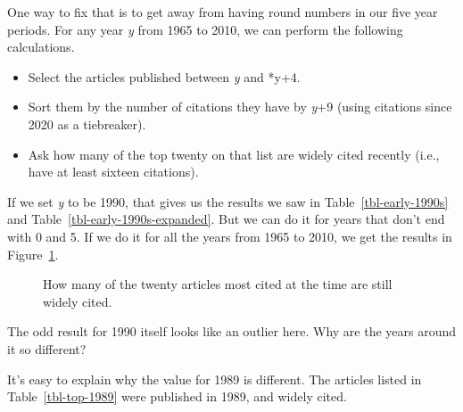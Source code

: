 \documentclass[
  10pt,
  letterpaper,
  DIV=11,
  numbers=noendperiod,
  twoside]{scrartcl}
\providecommand{\tightlist}{%
  \setlength{\itemsep}{0pt}\setlength{\parskip}{0pt}}\usepackage{longtable,booktabs,array}
\begin{document}
One way to fix that is to get away from having round numbers in our five
year periods. For any year \emph{y} from 1965 to 2010, we can perform
the following calculations.

\begin{itemize}
\tightlist
\item
  Select the articles published between \emph{y} and *y+4.
\item
  Sort them by the number of citations they have by \emph{y}+9 (using
  citations since 2020 as a tiebreaker).
\item
  Ask how many of the top twenty on that list are widely cited recently
  (i.e., have at least sixteen citations).
\end{itemize}

If we set \emph{y} to be 1990, that gives us the results we saw in
Table~\ref{tbl-early-1990s} and Table~\ref{tbl-early-1990s-expanded}.
But we can do it for years that don't end with 0 and 5. If we do it for
all the years from 1965 to 2010, we get the results in
Figure~\ref{fig-all-still-standing}.

\begin{figure}


\caption{\label{fig-all-still-standing}How many of the twenty articles
most cited at the time are still widely cited.}

\end{figure}%

The odd result for 1990 itself looks like an outlier here. Why are the
years around it so different?

It's easy to explain why the value for 1989 is different. The articles
listed in Table~\ref{tbl-top-1989} were published in 1989, and widely
cited.
\end{document}
